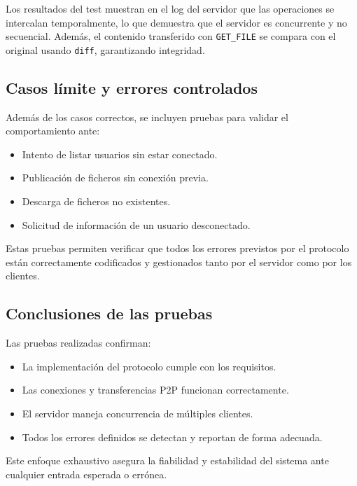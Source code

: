 \documentclass[12pt,a4paper]{article}
\begin{document}
Los resultados del test muestran en el log del servidor que las operaciones se intercalan temporalmente, lo que demuestra que el servidor es concurrente y no secuencial. Además, el contenido transferido con \texttt{GET\_FILE} se compara con el original usando \texttt{diff}, garantizando integridad.

\subsection{Casos límite y errores controlados}

Además de los casos correctos, se incluyen pruebas para validar el comportamiento ante:

\begin{itemize}
    \item Intento de listar usuarios sin estar conectado.
    \item Publicación de ficheros sin conexión previa.
    \item Descarga de ficheros no existentes.
    \item Solicitud de información de un usuario desconectado.
\end{itemize}

Estas pruebas permiten verificar que todos los errores previstos por el protocolo están correctamente codificados y gestionados tanto por el servidor como por los clientes.

\subsection{Conclusiones de las pruebas}

Las pruebas realizadas confirman:

\begin{itemize}
    \item La implementación del protocolo cumple con los requisitos.
    \item Las conexiones y transferencias P2P funcionan correctamente.
    \item El servidor maneja concurrencia de múltiples clientes.
    \item Todos los errores definidos se detectan y reportan de forma adecuada.
\end{itemize}

Este enfoque exhaustivo asegura la fiabilidad y estabilidad del sistema ante cualquier entrada esperada o errónea.


\clearpage
\end{document}
